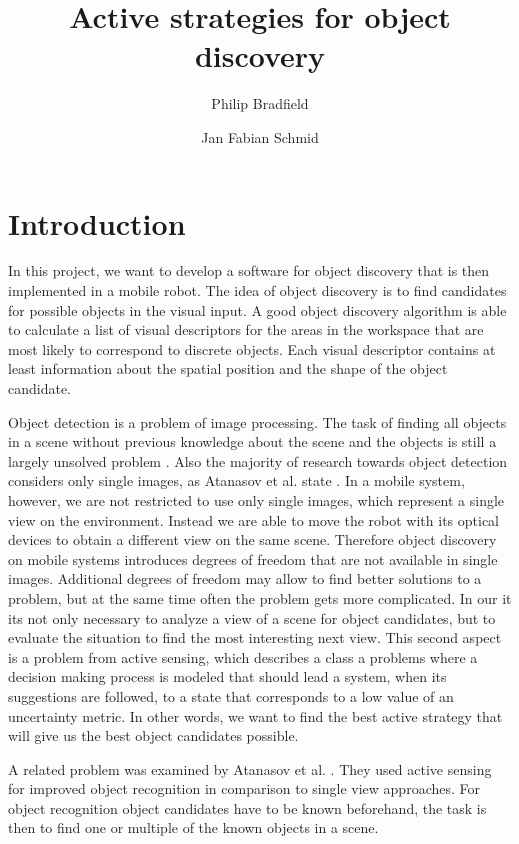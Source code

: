 \documentclass[a4paper,11pt,english]{article}
\begin{document}
\title{Active strategies for object discovery}
\author{Philip Bradfield \and Jan Fabian Schmid}
	
\maketitle 

\section{Introduction}
In this project, we want to develop a software for object discovery that is then implemented in a mobile robot.
The idea of object discovery is to find candidates for possible objects in the visual input. A good object discovery algorithm is able to calculate a list of visual descriptors for the areas in the workspace that are most likely to correspond to discrete objects.
Each visual descriptor contains at least information about the spatial position and the shape of the object candidate.

Object detection is a problem of image processing. The task of finding all objects in a scene without previous knowledge about the scene and the objects is still a largely unsolved problem \cite{garcia2013computational}.
Also the majority of research towards object detection considers only single images, as Atanasov et al. state \cite{atanasov2014nonmyopic}.
In a mobile system, however, we are not restricted to use only single images, which represent a single view on the environment. Instead we are able to move the robot with its optical devices to obtain a different view on the same scene.
Therefore object discovery on mobile systems introduces degrees of freedom that are not available in single images.
Additional degrees of freedom may allow to find better solutions to a problem, but at the same time often the problem gets more complicated.
In our it its not only necessary to analyze a view of a scene for object candidates, but to evaluate the situation to find the most interesting next view.
This second aspect is a problem from active sensing, which describes a class a problems where a decision making process is modeled that should lead a system, when its suggestions are followed, to a state that corresponds to a low value of an uncertainty metric.
In other words, we want to find the best active strategy that will give us the best object candidates possible.\medskip

A related problem was examined by Atanasov et al. \cite{atanasov2014nonmyopic}. They used active sensing for improved object recognition in comparison to single view approaches.
For object recognition object candidates have to be known beforehand, the task is then to find one or multiple of the known objects in a scene.
\end{document}
